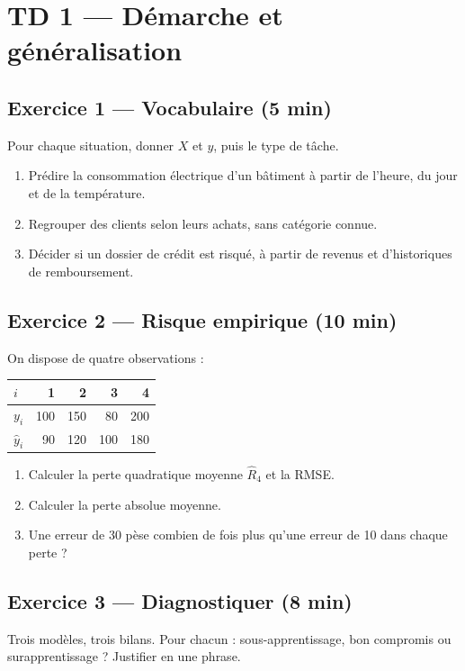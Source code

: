 \section*{TD 1 --- Démarche et généralisation}

\subsection*{Exercice 1 --- Vocabulaire \hfill \normalfont\footnotesize (5 min)}
Pour chaque situation, donner $X$ et $y$, puis le type de tâche.
\begin{enumerate}
  \item Prédire la consommation électrique d'un bâtiment à partir de l'heure,
        du jour et de la température.
  \item Regrouper des clients selon leurs achats, sans catégorie connue.
  \item Décider si un dossier de crédit est risqué, à partir de revenus et
        d'historiques de remboursement.
\end{enumerate}

\subsection*{Exercice 2 --- Risque empirique \hfill \normalfont\footnotesize (10 min)}
On dispose de quatre observations :

\begin{center}
\small
\begin{tabular}{@{}lrrrr@{}}
\toprule
$i$ & 1 & 2 & 3 & 4 \\
\midrule
$y_i$ & 100 & 150 & 80 & 200 \\
$\hat y_i$ & 90 & 120 & 100 & 180 \\
\bottomrule
\end{tabular}
\end{center}

\begin{enumerate}
  \item Calculer la perte quadratique moyenne $\hat R_4$ et la RMSE.
  \item Calculer la perte absolue moyenne.
  \item Une erreur de 30 pèse combien de fois plus qu'une erreur de 10 dans
        chaque perte ?
\end{enumerate}

\subsection*{Exercice 3 --- Diagnostiquer \hfill \normalfont\footnotesize (8 min)}
Trois modèles, trois bilans. Pour chacun : sous-apprentissage, bon compromis ou
surapprentissage ? Justifier en une phrase.

